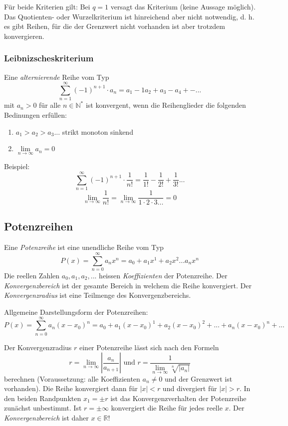 Für beide Kriterien gilt: Bei \(q = 1\) versagt das Kriterium (keine Aussage möglich). Das Quotienten- oder Wurzelkriterium ist hinreichend aber nicht notwendig, d. h. es gibt Reihen, für die der Grenzwert nicht vorhanden ist aber trotzdem konvergieren.

\subsubsection*{Leibnizscheskriterium}
\begin{definition}Eine \textit{alternierende} Reihe vom Typ
$$ \sum\limits_{n=1}^{\infty} (-1)^{n+1} \cdot a_n = a_1 -1 a_2 + a_3 - a_4 + - ...$$
mit $a_n > 0$ für alle $n \in \mathbb{N}^*$ ist konvergent, wenn die Reihenglieder die folgenden Bedinungen erfüllen:
\begin{enumerate}
	\item $a_1 > a_2 > a_3 ...$ strikt monoton sinkend
	\item $\lim\limits_{n \rightarrow \infty} a_n = 0$
\end{enumerate}
\end{definition}

Beispiel:
$$ \sum\limits_{n=1}^{\infty} (-1)^{n+1} \cdot \frac{1}{n!}  = \frac{1}{1!} - \frac{1}{2!} + \frac{1}{3!} ... $$ 
$$ \lim\limits_{n\rightarrow \infty} \frac{1}{n!} = \lim\limits_{n\rightarrow \infty} \frac{1}{1 \cdot 2 \cdot 3 ...} = 0$$

\subsection{Potenzreihen}
\begin{definition}Eine \textit{Potenzreihe} ist eine unendliche Reihe vom Typ $$P(x)= \sum\limits_{n=0}^{\infty} a_n x^n = a_0 + a_1x^1 + a_2 x^2 ... a_nx^n$$
Die reellen Zahlen $a_0, a_1, a_2, ...$ heissen \textit{Koeffizienten} der Potenzreihe. Der \textit{Konvergenzbereich} ist der gesamte Bereich in welchem die Reihe konvergiert. Der \textit{Konvergenzradius} ist eine Teilmenge des Konvergenzbereichs.
\end{definition}
Allgemeine Darstellungsform der Potenzreihen:
$$P(x) = \sum\limits_{n=0}^{\infty} a_n (x-x_0)^n = a_0 + a_1(x-x_0)^1 + a_2(x-x_0)^2 + ... + a_n(x-x_0)^n + ...$$
\begin{formel}
Der Konvergenzradius $r$ einer Potenzreihe lässt sich nach den Formeln 
$$r = \lim\limits_{n \rightarrow \infty} \left|\frac{a_n}{a_{n+1}}\right| \text{ und } r = \frac{1}{\lim\limits_{n \rightarrow \infty} \sqrt[n]{\left|a_n\right|}}$$
berechnen (Voraussetzung: alle Koeffizienten $a_n \neq 0$ und der Grenzwert ist vorhanden). Die Reihe konvergiert dann für $|x| < r$ und divergiert für $|x|>r$. In den beiden Randpunkten $x_1 = \pm r$ ist das Konvergenzverhalten der Potenzreihe zunächst unbestimmt. Ist $r = \pm \infty$ konvergiert die Reihe für jedes reelle $x$. Der \textit{Konvergenzbereich} ist daher $x \in \mathbb{R}$!
\end{formel}

